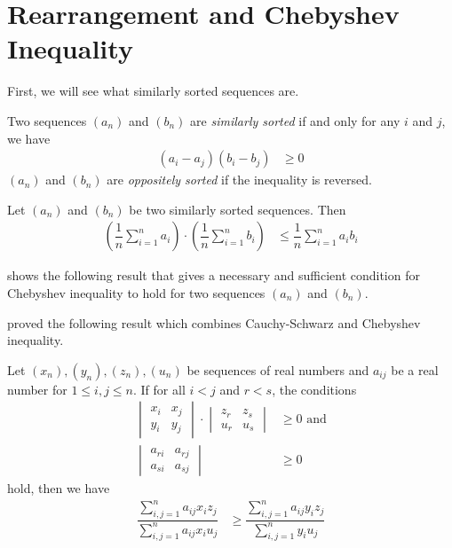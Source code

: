 \documentclass{subfile}
\begin{document}
	\section{Rearrangement and Chebyshev Inequality}\label{sec:rearragement}
	First, we will see what similarly sorted sequences are.
		\begin{definition}
			Two sequences $(a_n)$ and $(b_n)$ are \textit{similarly sorted} if and only for any $i$ and $j$, we have
				\begin{align*}
					(a_i-a_j)(b_i-b_j)
						& \geq0
				\end{align*}
			$(a_n)$ and $(b_n)$ are \textit{oppositely sorted} if the inequality is reversed.
		\end{definition}
	
		\begin{theorem}
			Let $(a_n)$ and $(b_n)$ be two similarly sorted sequences. Then
				\begin{align*}
					\left(\dfrac{1}{n}\sum_{i=1}^na_i\right)\cdot\left(\dfrac{1}{n}\sum_{i=1}^nb_i\right)
						& \leq\dfrac{1}{n}\sum_{i=1}^na_ib_i
				\end{align*}
		\end{theorem}
	\textcite{SASSER1967} shows the following result that gives a necessary and sufficient condition for Chebyshev inequality to hold for two sequences $(a_n)$ and $(b_n)$.
		\begin{theorem}
			
		\end{theorem}
	\textcite{Seitz1936} proved the following result which combines Cauchy-Schwarz and Chebyshev inequality.
		\begin{theorem}
			Let $(x_n),(y_n),(z_n),(u_n)$ be sequences of real numbers and $a_{ij}$ be a real number for $1\leq i,j\leq n$. If for all $i<j$ and $r<s$, the conditions
				\begin{align*}
					\begin{vmatrix}
						x_i & x_j\\
						y_i & y_j
					\end{vmatrix}\cdot
					\begin{vmatrix}
						z_r & z_s\\
						u_r & u_s
					\end{vmatrix}
						& \geq0\mbox{ and}\\
					\begin{vmatrix}
						a_{ri} & a_{rj}\\
						a_{si} & a_{sj}
					\end{vmatrix}
						& \geq0
				\end{align*}
			hold, then we have
				\begin{align*}
					\dfrac{\sum_{i,j=1}^na_{ij}x_iz_j}{\sum_{i,j=1}^na_{ij}x_iu_j}
						& \geq\dfrac{\sum_{i,j=1}^na_{ij}y_iz_j}{\sum_{i,j=1}^ny_iu_j}
				\end{align*}
		\end{theorem}
\end{document}
